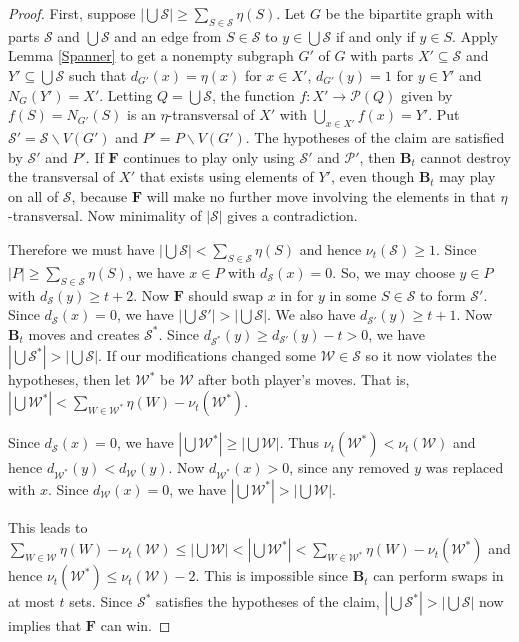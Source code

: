\documentclass[12pt]{amsart}
\theoremstyle{plain}
\theoremstyle{definition}
\theoremstyle{remark}
\newcommand{\fancy}[1]{\mathcal{#1}}
\newcommand{\card}[1]{\left|#1\right|}
\newcommand{\func}[3]{#1\colon #2 \rightarrow #3}
\newcommand{\parens}[1]{\left( #1 \right)}
\renewcommand{\S}{\fancy{S}}
\newcommand{\W}{\fancy{W}}
\renewcommand{\P}{\fancy{P}}
\newcommand{\F}{\mathbf{F}}
\newcommand{\B}{\mathbf{B}}
\newcommand{\myhat}[1]{#1^*}
\begin{document}
\begin{proof}
First, suppose $\card{\bigcup \S} \ge \sum_{S \in \S} \eta(S)$.  Let $G$ be the bipartite graph with parts $\S$ and $\bigcup \S$ and an edge from $S \in \S$ to $y \in \bigcup \S$ if and only if $y \in S$.  Apply Lemma \ref{Spanner} to get a nonempty subgraph $G'$ of $G$ with parts $X' \subseteq \S$ and $Y' \subseteq \bigcup \S$ such that $d_{G'}(x) = \eta(x)$ for $x \in X'$, $d_{G'}(y) = 1$ for $y \in Y'$ and $N_G(Y') = X'$.
Letting $Q = \bigcup \S$, the function $\func{f}{X'}{\P\parens{Q}}$ given by $f(S) = N_{G'}(S)$ is an $\eta$-transversal of $X'$ with $\bigcup_{x \in X'} f(x) = Y'$. Put $\S' = \S \smallsetminus V(G')$ and $P' = P \smallsetminus V(G')$. 
The hypotheses of the claim are satisfied by $\S'$ and $P'$.  If $\F$ continues to play only using $\S'$ and $\P'$, then $\B_t$ cannot destroy the transversal of $X'$ that exists using elements of $Y'$, 
even though $\B_t$ may play on all of $\S$, because $\F$ will make no further move involving the elements in that $\eta$-transversal. 
Now minimality of $\card{\S}$ gives a contradiction.

Therefore we must have $\card{\bigcup \S} < \sum_{S \in \S} \eta(S)$ and hence $\nu_t(\S) \geq
1$. Since $\card{P} \ge \sum_{S \in \S} \eta(S)$, we have $x \in P$ with $d_{\S}(x) = 0$.  So, we may choose $y \in P$
with $d_{\S}(y) \geq t + 2$. Now $\F$ should swap $x$ in for $y$ in some $S \in
\S$ to form $\S'$.  Since $d_{\S}(x) = 0$, we have $\card{\bigcup \S'} >
\card{\bigcup \S}$.  We also have $d_{\S'}(y) \geq t + 1$.  Now $\B_t$ moves
and creates $\myhat{\S}$. Since $d_{\myhat{\S}}(y) \geq d_{\S'}(y) - t > 0$, we have 
$\card{\bigcup \myhat{\S}} > \card{\bigcup \S}$.  If our modifications changed
some $\W \in \S$ so it now violates the hypotheses, then let $\myhat{\W}$ be $\W$
after both player's moves.  That is, $\card{\bigcup \myhat{\W}} < \sum_{W \in \myhat{\W}} \eta(W) - \nu_t(\myhat{\W})$.

Since $d_{\S}(x) = 0$, we have $\card{\bigcup \myhat{\W}} \ge \card{\bigcup \W}$.  Thus
$\nu_t(\myhat{\W}) < \nu_t(\W)$ and hence $d_{\myhat{\W}}(y) < d_{\W}(y)$.  Now
$d_{\myhat{\W}}(x) > 0$, since any removed $y$ was replaced with $x$. Since $d_{\W}(x) = 0$, we have $\card{\bigcup \myhat{\W}} > \card{\bigcup \W}$.

This leads to $\sum_{W \in \W} \eta(W) - \nu_t(\W) \le \card{\bigcup\W} < \card{\bigcup \myhat{\W}} < \sum_{W \in \myhat{\W}} \eta(W) - \nu_t(\myhat{\W})$ 
and hence $\nu_t(\myhat{\W}) \le \nu_t(\W) - 2$. This is impossible
since $\B_t$ can perform swaps in at most $t$ sets.
Since $\myhat{\S}$ satisfies the hypotheses of the claim, $\card{\bigcup \myhat{\S}} >
\card{\bigcup \S}$ now implies that $\F$ can win.
\end{proof}
\end{document}
